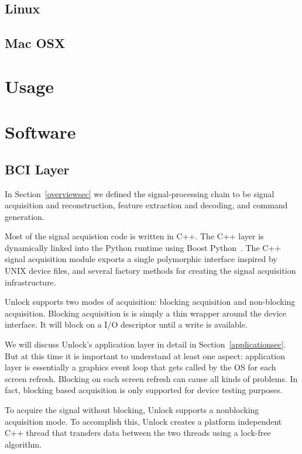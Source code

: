 \documentclass[11pt]{article}
\begin{document}
\subsection{Linux}
\subsection{Mac OSX}

\section{Usage}

\section{Software}
\subsection{BCI Layer}\label{bcisec}

In Section~\ref{overviewsec} we defined the signal-processing chain to be signal acquisition and reconstruction, feature extraction and decoding, and command generation.

Most of the signal acquistion code is written in C++.  The C++ layer is dynamically linked into the Python runtime using Boost Python~\cite{boostpython}.  The C++ signal acquisition module exports a single polymorphic interface inspired by UNIX device files, and several factory methods for creating the signal acquisition infrastructure.

Unlock supports two modes of acquisition: blocking acquisition and non-blocking acquisition.  Blocking acquisition is is simply a thin wrapper around the device interface.  It will block on a I/O descriptor until a write is available.

We will discuss Unlock's application layer in detail in Section~\ref{applicationsec}.  But at this time it is important to understand at least one aspect: application layer is essentially a graphics event loop that gets called by the OS for each screen refresh.  Blocking on each screen refresh can cause all kinds of problems.  In fact, blocking based acquisition is only supported for device testing purposes. 

To acquire the signal without blocking, Unlock supports a nonblocking acquisition mode.  To accomplish this, Unlock creates a platform independent C++ thread that transfers data between the two threads using a lock-free algorithm.
\end{document}
